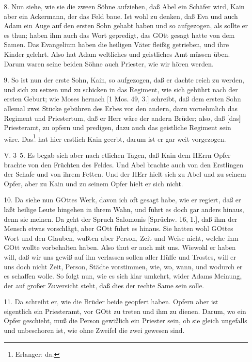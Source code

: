 8. Nun siehe, wie sie die zween Söhne aufziehen, daß Abel ein Schäfer wird, Kain aber ein Ackermann, der das Feld baue. Ist wohl zu denken, daß Eva und auch Adam ein Auge auf den ersten Sohn gehabt haben und so aufgezogen, als sollte er es thun; haben ihm auch das Wort gepredigt, das GOtt gesagt hatte von dem Samen. Das Evangelium haben die heiligen Väter fleißig getrieben, und ihre Kinder gelehrt. Also hat Adam weltliches und geistliches Amt müssen üben. Darum waren seine beiden Söhne auch Priester, wie wir hören werden.

9. So ist nun der erste Sohn, Kain, so aufgezogen, daß er dachte reich zu werden, und sich zu setzen und zu schicken in das Regiment, wie sich gebührt nach der ersten Geburt; wie Moses hernach [1 Mos. 49, 3.] schreibt, daß dem ersten Sohn allemal zwei Stücke gebühren des Erbes vor den andern, dazu vornehmlich das Regiment und Priestertum, daß er Herr wäre der andern Brüder; also, daß [das] Priesteramt, zu opfern und predigen, dazu auch das geistliche Regiment sein wäre. Das\footnote{Erlanger: da.} hat hier erstlich Kain geerbt, darum ist er gar weit vorgezogen.

\begin{schriftzitat}
V. 3–5. Es begab sich aber nach etlichen Tagen, daß Kain dem HErrn Opfer brachte von den Früchten des Feldes. Und Abel brachte auch von den Erstlingen der Schafe und von ihrem Fetten. Und der HErr hielt sich zu Abel und zu seinem Opfer, aber zu Kain und zu seinem Opfer hielt er sich nicht.
\end{schriftzitat}

10. Da siehe nun GOttes Werk, davon ich oft gesagt habe, wie er regiert, daß er läßt heilige Leute hingehen in ihrem Wahn, und führt es doch gar anders hinaus, denn sie meinen. Da geht der Spruch Salomonis [Sprüchw. 16, 1.], daß ihm der Mensch etwas vorschlägt, aber GOtt führt es hinaus. Sie hatten wohl GOttes Wort und den Glauben, wußten aber Person, Zeit und Weise nicht, welche ihm GOtt wollte vorbehalten haben. Also thut er auch mit uns. Wiewohl er haben will, daß wir uns gewiß auf ihn verlassen sollen aller Hülfe und Trostes, will er uns doch nicht Zeit, Person, Städte vorstimmen, wie, wo, wann, und wodurch er es schaffen wolle. So folgt nun, wie es sich klar umkehrt, wider Adams Meinung, der auf großer Zuversicht steht, daß dies der rechte Same sein solle.

11. Da schreibt er, wie die Brüder beide geopfert haben. Opfern aber ist eigentlich ein Priesteramt, vor GOtt zu treten und ihm zu dienen. Darum, wo ein Opfer geschieht, muß die Person gewißlich ein Priester sein, ob sie gleich ungefalls und unbeschoren ist, wie ohne Zweifel die zwei gewesen sind.

